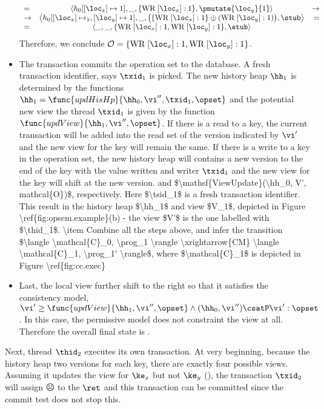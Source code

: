 \begin{itemize}
{\begin{equation}
\begin{array}{lcr}
=&\left \langle h_0[[\loc_x] \mapsto 1], \_, \{\text{WR}\; [\loc_x]: 1\}, 
\pmutate{\loc_y}{1} \right\rangle 
&\rightarrow\\ 
\rightarrow & 
\left\langle h_0[[\loc_x] \mapsto_1, [\loc_y] \mapsto 1], \_, \big( \{\text{WR}\;[\loc_x]:1\} \oplus  (\text{WR}\;[\loc_y]: 1) \big), 
\stub \right\rangle & = \\
=& \left \langle \_, \_, \{\text{WR}\;[\loc_x]: 1, \text{WR}\;[\loc_y]:1 \}, \stub \right\rangle
\end{array}
\end{equation}
Therefore, we conclude $\mathcal{O} = \{\text{WR}\; [\loc_x] : 1, \text{WR}\;[\loc_y]:1\}$.
}
\item The transaction commits the operation set to the database.
A fresh transaction identifier, says \( \txid_{1} \) is picked.
The new history heap \( \hh_{1} \) is determined by the functions $\hh_{1} = \func{updHisHp}{\hh_0, \vi'',\txid_1, \opset}$ and the potential new view the thread \( \txid_{1}\) is given by the function  \( \func{updView}{\hh_1, \vi'' ,\opset}\).
If there is a read to a key, the current transaction will be added into the read set of the version indicated by \( \vi' \) and the new view for the key will remain the same.
If there is a write to a key in the operation set, the new history heap will contains a new version to the end of the key with the value written and writer \( \txid_{1} \) and the new view for the key  will shift at the new version.
\ac{
and  $\mathsf{ViewUpdate}(\hh_0, V', mathcal{O})$, respectively. Here $\tsid_1$ is a fresh transaction identifier. 
This result in the history heap $\hh_1$ and view $V_1$, depicted in 
Figure \ref{fig:opsem.example}(b) - the view $V'$ is the one labelled with $\thid_1$.
\item Combine all the steps above, and infer the transition $\langle \mathcal{C}_0, \prog_1 \rangle \xrightarrow{CM} 
\langle \mathcal{C}_1, \prog_1' \rangle$, where $\mathcal{C}_1$ is depicted in Figure \ref{fig:cc.exec} 
}
\item Last, the local view further shift to the right so that it satisfies the consistency model, \( \vi' \geq \func{updView}{\hh_1, \vi'' ,\opset} \land (\hh_{0}, \vi'') \csatP \vi' : \opset \).
In this case, the permissive model does not constraint the view at all.
Therefore the overall final state is .
\end{itemize}

Next, thread $\thid_2$ executes its own transaction. 
At very beginning, because the history heap two versions for each key, there are exactly four possible views.
Assuming it updates the view for \( \ke_{x} \) but not \( \ke_y \) (), the transaction \( \txid_{2} \) will assign \(\sadface\) to the \( \ret\) and this transaction can be committed since the commit test does not stop this.

